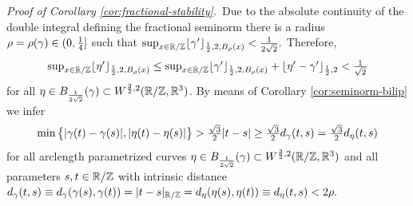 \noindent
{\it Proof of Corollary \ref{cor:fractional-stability}.}\,
Due to the absolute continuity of the double integral defining the
fractional seminorm there is a radius $\rho=\rho(\gamma)\in (0,\frac14]$  such
that $\sup_{x\in\mathbb{R}/\mathbb{Z}}\lfloor \gamma'\rfloor_{\frac12,2,B_\rho(x)} <\frac1{2\sqrt{2}}.$
Therefore,
\begin{equation}\label{eq:eta-seminorm}
\textstyle
\sup_{x\in\mathbb{R}/\mathbb{Z}}\lfloor \eta' \rfloor_{\frac12,2,B_\rho(x)}
\le
\sup_{x\in\mathbb{R}/\mathbb{Z}}\lfloor \gamma' \rfloor_{\frac12,2,B_\rho(x)}+\lfloor
\eta'-\gamma' \rfloor_{\frac12,2} < \frac1{\sqrt{2}}
\end{equation}
for all $\eta \in B_{\frac1{2\sqrt{2}}}(\gamma)\subset W^{\frac32,2}(\mathbb{R}/\mathbb{Z},\mathbb{R}^3)$. By
means of Corollary \ref{cor:seminorm-bilip} we infer
\begin{equation}\label{eq:bilip-gamma-eta}
\textstyle
\min\big\{|\gamma(t)-\gamma(s)|,|\eta(t)-\eta(s)|\big\}>\frac{\sqrt{3}}2 
|t-s|\ge\frac{\sqrt{3}}2 d_\gamma(t,s)
=\frac{\sqrt{3}}2 d_\eta(t,s)
\end{equation}
for all arclength parametrized curves $\eta\in B_{\frac1{2\sqrt{2}}}(\gamma)\subset
W^{\frac32,2}(\mathbb{R}/\mathbb{Z},\mathbb{R}^3)$ and all parameters $s,t\in\mathbb{R}/\mathbb{Z}$ with
intrinsic distance $d_\gamma(t,s)\equiv d_\gamma(\gamma(s),\gamma(t))=|t-s|_{\mathbb{R}/\mathbb{Z}}=
d_\eta(\eta(s),\eta(t))\equiv d_\eta(t,s)<2\rho.$

